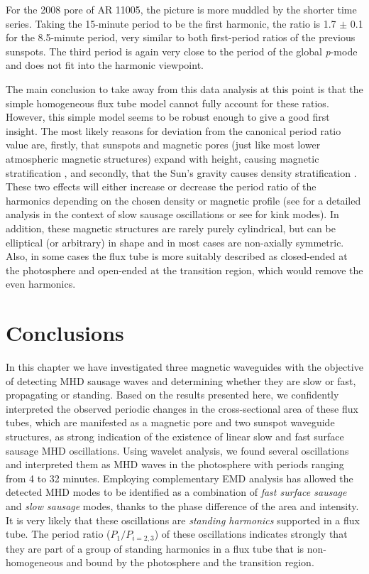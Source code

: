 	For the 2008 pore of AR 11005, the picture is more muddled by the shorter time series.
	Taking the 15-minute period to be the first harmonic, the ratio is 1.7 $\pm$ 0.1 for the 8.5-minute period, very similar to both first-period ratios of the previous sunspots.
	The third period is again very close to the period of the global \textit{p}-mode and does not fit into the harmonic viewpoint.
	
	The main conclusion to take away from this data analysis at this point is that the simple homogeneous flux tube model cannot fully account for these ratios.
	However, this simple model seems to be robust enough to give a good first insight.
	The most likely reasons for deviation from the canonical period ratio value are, firstly, that sunspots and magnetic pores (just like most lower atmospheric magnetic structures) expand with height, causing magnetic stratification \citep{2008A&A...486.1015V,luna-cardozo}, and secondly, that the Sun's gravity causes density stratification \citep{Andries2009}.
	These two effects will either increase or decrease the period ratio of the harmonics depending on the chosen density or magnetic profile (see \citet{luna-cardozo} for a detailed analysis in the context of slow sausage oscillations or see \citet{2013SoPh..tmp..195E} for kink modes).
	In addition, these magnetic structures are rarely purely cylindrical, but can be elliptical (or arbitrary) in shape \citep[see][]{Ruderman2009,2009A&A...502..315M} and in most cases are non-axially symmetric.
	Also, in some cases the flux tube is more suitably described as closed-ended at the photosphere and open-ended at the transition region, which would remove the even harmonics.
	 
\section{Conclusions}

	In this chapter we have investigated three magnetic waveguides with the objective of detecting MHD sausage waves and determining whether they are slow or fast, propagating or standing.
	Based on the results presented here, we confidently interpreted the observed periodic changes in the cross-sectional area of these flux tubes, which are manifested as a magnetic pore and two sunspot waveguide structures, as strong indication of the existence of linear slow and fast surface sausage MHD oscillations.
	Using wavelet analysis, we found several oscillations and interpreted them as MHD waves in the photosphere with periods ranging from 4 to 32 minutes.
	Employing complementary EMD analysis has allowed the detected MHD modes to be identified as a combination of \textit{fast surface sausage} and \textit{slow sausage} modes, thanks to the phase difference of the area and intensity.
	It is very likely that these oscillations are \textit{standing harmonics} supported in a flux tube.
	The period ratio ($P_{1}/P_{i=2,3}$) of these oscillations indicates strongly that they are part of a group of standing harmonics in a flux tube that is non-homogeneous and bound by the photosphere and the transition region.